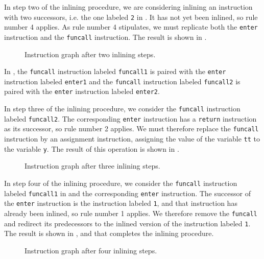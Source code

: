 In step two of the inlining procedure, we are considering inlining an
instruction with two successors, i.e. the one labeled \texttt{2} in
.  It has not yet been inlined, so rule number 4
applies.  As rule number 4 stipulates, we must replicate both the
\texttt{enter} instruction and the \texttt{funcall} instruction.  The
result is shown in .

\begin{figure}
\begin{center}
\end{center}
\caption{\label{fig44}
Instruction graph after two inlining steps.}
\end{figure}

In , the \texttt{funcall} instruction labeled
\texttt{funcall1} is paired with the \texttt{enter} instruction
labeled \texttt{enter1} and the \texttt{funcall} instruction labeled
\texttt{funcall2} is paired with the \texttt{enter} instruction
labeled \texttt{enter2}.

In step three of the inlining procedure, we consider the
\texttt{funcall} instruction labeled \texttt{funcall2}.  The
corresponding \texttt{enter} instruction has a \texttt{return}
instruction as its successor, so rule number 2 applies.  We must
therefore replace the \texttt{funcall} instruction by an assignment
instruction, assigning the value of the variable \texttt{tt} to the
variable \texttt{y}.  The result of this operation is shown in
.

\begin{figure}
\begin{center}
\end{center}
\caption{\label{fig45}
Instruction graph after three inlining steps.}
\end{figure}

In step four of the inlining procedure, we consider the
\texttt{funcall} instruction labeled \texttt{funcall1} in
 and the corresponding \texttt{enter} instruction. The
successor of the \texttt{enter} instruction is the instruction labeled
\texttt{1}, and that instruction has already been inlined, so rule
number 1 applies.  We therefore remove the \texttt{funcall} and
redirect its predecessors to the inlined version of the instruction
labeled \texttt{1}.  The result is shown in , and that
completes the inlining procedure.

\begin{figure}
\begin{center}
\end{center}
\caption{\label{fig46}
Instruction graph after four inlining steps.}
\end{figure}

